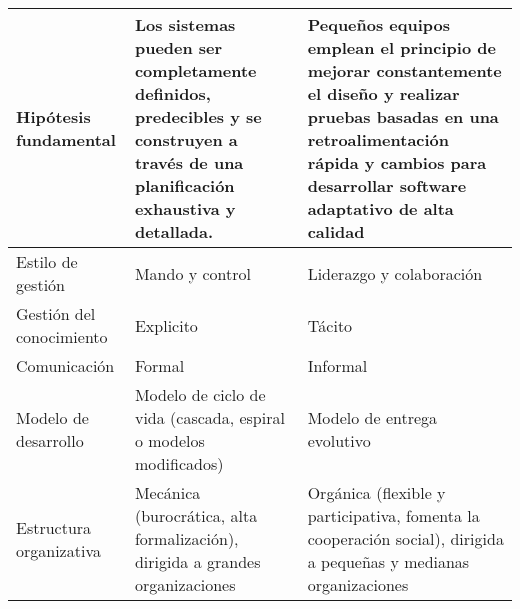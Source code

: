 \begin{longtable}{|p{5cm}|p{5cm}|p{5cm}|}
    \hline \hline
    \endlastfoot
    Hipótesis fundamental                          & Los sistemas pueden ser completamente definidos, predecibles y se construyen a través de una planificación exhaustiva y detallada. & Pequeños equipos emplean el principio de mejorar constantemente el diseño y realizar pruebas basadas en una retroalimentación rápida y cambios para desarrollar software adaptativo de alta calidad \\\hline
    Estilo de gestión                              & Mando y control                                                                                                                    & Liderazgo y colaboración                                                                                                                                                                            \\\hline
    Gestión del conocimiento                       & Explicito                                                                                                                          & Tácito                                                                                                                                                                                              \\\hline
    Comunicación                                   & Formal                                                                                                                             & Informal                                                                                                                                                                                            \\\hline
    Modelo de desarrollo                           & Modelo de ciclo de vida (cascada, espiral o modelos modificados)                                                                   & Modelo de entrega evolutivo                                                                                                                                                                         \\\hline
    Estructura organizativa                        & Mecánica (burocrática, alta formalización), dirigida a grandes organizaciones                                                      & Orgánica (flexible y participativa, fomenta la cooperación social), dirigida a pequeñas y medianas organizaciones                                                                                   \\\hline

\end{longtable}
